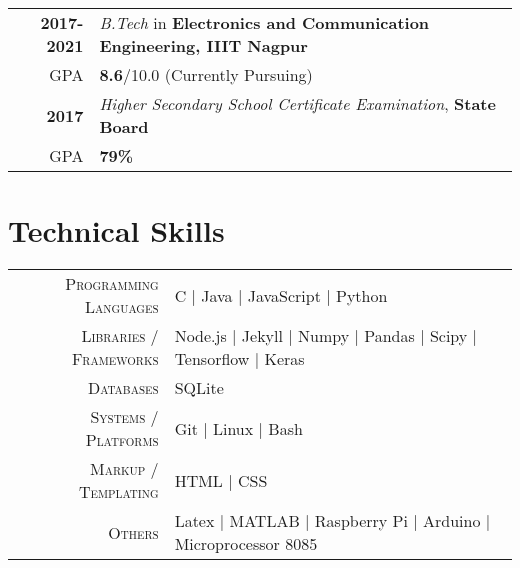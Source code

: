 \documentclass[a4paper,10pt]{extarticle} %
\begin{document}
\begin{tabular}{r|p{17.5cm}}	
\textbf{2017-2021} & \textit{B.Tech} in \textbf{Electronics and Communication Engineering, IIIT Nagpur}\\
\hfill GPA & \textbf{8.6}/10.0 (Currently Pursuing)\\
\textbf{2017} & \textit{Higher Secondary School Certificate Examination}, \textbf{State Board}\\
\hfill GPA & \textbf{79\%}\\
\end{tabular}


\section{\textcolor{primary}{Technical Skills}}

\begin{tabular}{r|p{15cm}}
\textsc{Programming Languages} & C | Java | JavaScript | Python  \\
\textsc{Libraries / Frameworks} & Node.js | Jekyll | Numpy | Pandas | Scipy | Tensorflow | Keras\\
\textsc{Databases} & SQLite \\
\textsc{Systems / Platforms} & Git | Linux | Bash\\
\textsc{Markup / Templating} & HTML | CSS \\
\textsc{Others} &  Latex | MATLAB | Raspberry Pi | Arduino | Microprocessor 8085
\end{tabular}




\end{document}
